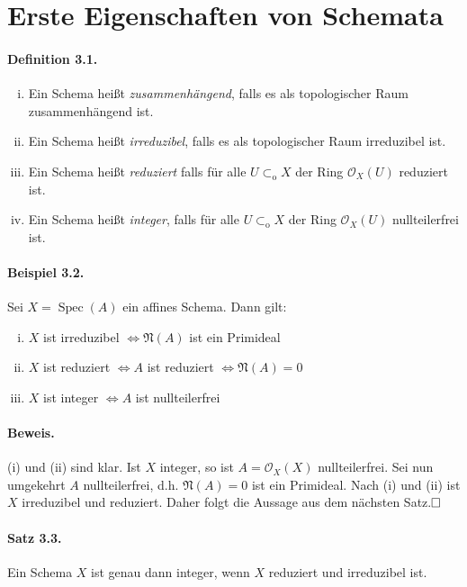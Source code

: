 \documentclass[11pt,b5paper,openany]{memoir}
\def \qed {$\hfill\square$}
\begin{document}
\section{Erste Eigenschaften von Schemata}

\paragraph{Definition 3.1.}\label{3.1} \begin{enumerate}[(i)]
\item Ein Schema heißt \textit{zusammenhängend}, falls es als topologischer Raum zu\-sam\-men\-hän\-gend ist.
\item Ein Schema heißt \textit{irreduzibel}, falls es als topologischer Raum irreduzibel ist.
\item Ein Schema heißt \textit{reduziert} falls für alle $U\subset_\text{o}X$ der Ring $\mathcal{O}_X(U)$ reduziert ist.
\item Ein Schema heißt \textit{integer}, falls für alle $U\subset_\text{o}X$ der Ring $\mathcal{O}_X(U)$ nullteilerfrei ist.
\end{enumerate}

\paragraph{Beispiel 3.2.}\label{3.2} Sei $X=\operatorname{Spec}(A)$ ein affines Schema. Dann gilt:
\begin{enumerate}[(i)]
\item $X$ ist irreduzibel $\iff \mathfrak{N}(A)$ ist ein Primideal
\item $X$ ist reduziert $\iff A$ ist reduziert $\iff\mathfrak{N}(A)=0$
\item $X$ ist integer $\iff A$ ist nullteilerfrei
\end{enumerate}

\paragraph{Beweis.} (i) und (ii) sind klar. Ist $X$ integer, so ist $A=\mathcal{O}_X(X)$ nullteilerfrei. Sei nun umgekehrt $A$ nullteilerfrei, d.h. $\mathfrak{N}(A)=0$ ist ein Primideal. Nach (i) und (ii) ist $X$ irreduzibel und reduziert. Daher folgt die Aussage aus dem nächsten Satz.\qed

\paragraph{Satz 3.3.}\label{3.3} Ein Schema $X$ ist genau dann integer, wenn $X$ reduziert und irreduzibel ist.
\end{document}
